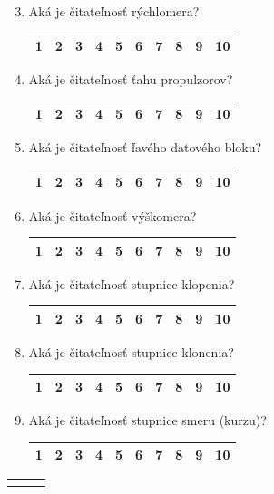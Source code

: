 \newcommand{\usetbl}{%
  \begin{tabular}{ c c c c c c c c c c}
    \hline
    1 & 2 & 3 & 4 & 5 & 6 & 7 & 8 & 9 & 10\\
    \hline
  \end{tabular}
}

\newcommand\prop[1]{%
  \item
  \parbox[t]{0.47\textwidth}{#1}%
  \qquad
  \parbox[t]{0.53\textwidth}{\usetbl}%
}

\printtblhdr

\begin{enumerate}
\setcounter{enumi}{2}
\prop{Aká je čitateľnosť rýchlomera?}

\prop{Aká je čitateľnosť ťahu propulzorov?}

\prop{Aká je čitateľnosť ľavého datového bloku?}

\prop{Aká je čitateľnosť výškomera?}

\prop{Aká je čitateľnosť stupnice klopenia?}

\prop{Aká je čitateľnosť stupnice klonenia?}

\prop{Aká je čitateľnosť stupnice smeru (kurzu)?}


\end{enumerate}


\newcommand{\printtblhdrr}{%
  \hfill
  \begingroup
  \setlength\tabcolsep{0pt}%
  \begin{tabularx}{0.41\textwidth}{ @{} l *{3}X r @{} }
    \multicolumn{2}{l}{\bfseries\shortstack[l]{Nepáči}}
    &&
    \multicolumn{2}{l}{\bfseries\shortstack[r]{Páči}}
    \\
  \end{tabularx}
  \endgroup
}

\newcommand{\usetbll}{%
  \begin{tabular}{ c c c c c c c c c c}
    \hline
    1 & 2 & 3 & 4 & 5 & 6 & 7 & 8 & 9 & 10\\
    \hline
  \end{tabular}
}

\newcommand\propp[1]{%
  \item
  \parbox[t]{0.47\textwidth}{#1}%
  \qquad
  \parbox[t]{0.53\textwidth}{\usetbll}%
}

\printtblhdrr

